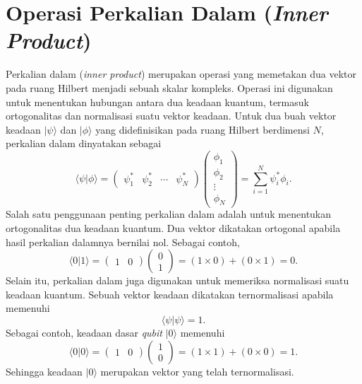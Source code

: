 \section{Operasi Perkalian Dalam (\textit{Inner Product})}
Perkalian dalam (\textit{inner product}) merupakan operasi yang memetakan dua vektor pada ruang Hilbert menjadi sebuah skalar kompleks. Operasi ini digunakan untuk menentukan hubungan antara dua keadaan kuantum, termasuk ortogonalitas dan normalisasi suatu vektor keadaan. Untuk dua buah vektor keadaan $|\psi\rangle$ dan $|\phi\rangle$ yang didefinisikan pada ruang Hilbert berdimensi $N$, perkalian dalam dinyatakan sebagai
\begin{equation}
\label{eq:inner_product_def}
    \langle \psi | \phi \rangle =
    \begin{pmatrix}
        \psi_1^* &
        \psi_2^* &
        \cdots &
        \psi_N^*
    \end{pmatrix}
    \begin{pmatrix}
        \phi_1 \\
        \phi_2 \\
        \vdots \\
        \phi_N
    \end{pmatrix}
    =
    \sum_{i=1}^{N}
    \psi_i^* \phi_i.
\end{equation}
Salah satu penggunaan penting perkalian dalam adalah untuk menentukan ortogonalitas dua keadaan kuantum. Dua vektor dikatakan ortogonal apabila hasil perkalian dalamnya bernilai nol. Sebagai contoh,
\begin{equation}
\label{eq:inner_product_orthogonal}
    \langle 0 | 1 \rangle
    =
    \begin{pmatrix}
        1 & 0
    \end{pmatrix}
    \begin{pmatrix}
        0 \\
        1
    \end{pmatrix}
    =
    (1 \times 0) + (0 \times 1)
    =
    0.
\end{equation}
Selain itu, perkalian dalam juga digunakan untuk memeriksa normalisasi suatu keadaan kuantum. Sebuah vektor keadaan dikatakan ternormalisasi apabila memenuhi
\begin{equation}
    \langle \psi | \psi \rangle = 1.
\end{equation}
Sebagai contoh, keadaan dasar \textit{qubit} $|0\rangle$ memenuhi
\begin{equation}
\label{eq:inner_product_normal}
    \langle 0 | 0 \rangle
    =
    \begin{pmatrix}
        1 & 0
    \end{pmatrix}
    \begin{pmatrix}
        1 \\
        0
    \end{pmatrix}
    =
    (1 \times 1) + (0 \times 0)
    =
    1.
\end{equation}
Sehingga keadaan $|0\rangle$ merupakan vektor yang telah ternormalisasi.

